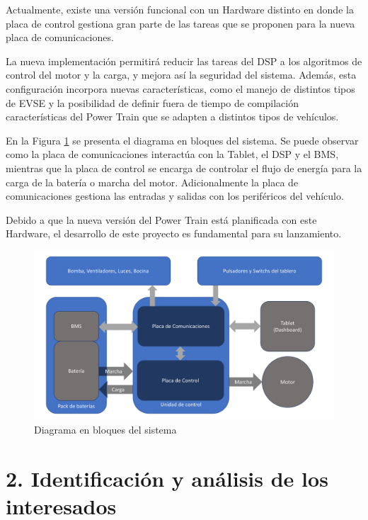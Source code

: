 \documentclass[
11pt, %
codirector, %
]{charter}
\begin{document}
Actualmente, existe una versión funcional con un Hardware distinto en donde la placa de control gestiona gran parte de las tareas que se proponen para la nueva placa de comunicaciones.

La nueva implementación permitirá reducir las tareas del DSP a los algoritmos de control del motor y la carga, y mejora así la seguridad del sistema. Además, esta configuración incorpora nuevas características, como el manejo de distintos tipos de EVSE y la posibilidad de definir fuera de tiempo de compilación características del Power Train que se adapten a distintos tipos de vehículos.



En la Figura \ref{fig:diagBloques} se presenta el diagrama en bloques del sistema. Se puede observar como la placa de comunicaciones interactúa con la Tablet, el DSP y el BMS, mientras que la placa de control se encarga de controlar el flujo de energía para la carga de la batería o marcha del motor. Adicionalmente la placa de comunicaciones gestiona las entradas y salidas con los periféricos del vehículo.

Debido a que la nueva versión del Power Train está planificada con este Hardware, el desarrollo de este proyecto es fundamental para su lanzamiento.

\begin{figure}[htpb]
	\centering
	\includegraphics[width=.9\textwidth]{./Figuras/EsquematicoPT.pdf}
	\caption{Diagrama en bloques del sistema}
	\label{fig:diagBloques}
\end{figure}

\vspace{25px}

\section{2. Identificación y análisis de los interesados}
\label{sec:interesados}
\end{document}
